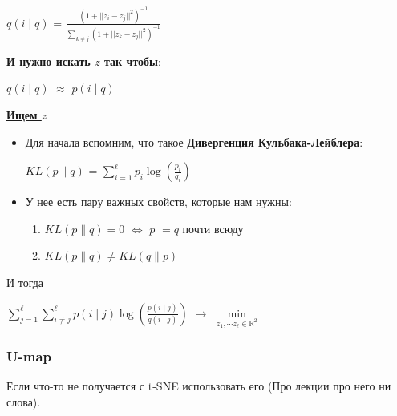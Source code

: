 
            \begin{center}
            \large
                $q(i \mid q)$ = $\frac{(1 + || z_i - z_j ||^2)^{-1}}{\sum\limits_{k \neq j}(1 + || z_k - z_j ||^2)^{-1}}$
            \end{center}

            \textbf{И нужно искать $z$ так чтобы}: 
            \begin{center}
            \large
                $q(i \mid q)$ $\approx$ $p(i \mid q)$
            \end{center}

            \underline{\textbf{Ищем $z$}}
            \begin{itemize}
                \item Для начала вспомним, что такое \textbf{Дивергенция Кульбака-Лейблера}:
                \begin{center}
                \large
                    $KL(p \parallel q)$ = $\sum_{i = 1}^\ell p_i\log(\frac{p_i}{q_i})$
                \end{center}

                \item У нее есть пару важных свойств, которые нам нужны:
                \begin{enumerate}
                    \item $KL(p \parallel q) = 0$ $\Longleftrightarrow$ $p$ $= q$ почти всюду

                    \item $KL(p \parallel q) \neq KL(q \parallel p)$
                \end{enumerate}
            \end{itemize}
            И тогда
            \begin{center}
                \Large
                $\sum\limits_{j = 1}^\ell\sum\limits_{i \neq j}^\ell p(i \mid j)\log(\frac{p(i \mid j)}{q(i \mid j)})$ $\longrightarrow$ $\min\limits_{z_1, \cdots z_\ell \in \mathbb{R}^2}$
            \end{center}

        \subsubsection{U-map}
            Если что-то не получается с t-SNE использовать его (Про лекции про него ни слова).


